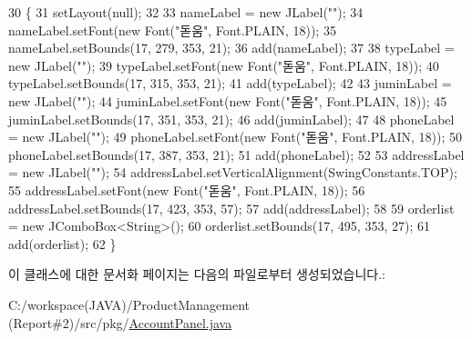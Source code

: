 \begin{DoxyCode}
30                               \{
31         setLayout(null);
32         
33         nameLabel = \textcolor{keyword}{new} JLabel(\textcolor{stringliteral}{""});
34         nameLabel.setFont(\textcolor{keyword}{new} Font(\textcolor{stringliteral}{"돋움"}, Font.PLAIN, 18));
35         nameLabel.setBounds(17, 279, 353, 21);
36         add(nameLabel);
37         
38         typeLabel = \textcolor{keyword}{new} JLabel(\textcolor{stringliteral}{""});
39         typeLabel.setFont(\textcolor{keyword}{new} Font(\textcolor{stringliteral}{"돋움"}, Font.PLAIN, 18));
40         typeLabel.setBounds(17, 315, 353, 21);
41         add(typeLabel);
42         
43         juminLabel = \textcolor{keyword}{new} JLabel(\textcolor{stringliteral}{""});
44         juminLabel.setFont(\textcolor{keyword}{new} Font(\textcolor{stringliteral}{"돋움"}, Font.PLAIN, 18));
45         juminLabel.setBounds(17, 351, 353, 21);
46         add(juminLabel);
47         
48         phoneLabel = \textcolor{keyword}{new} JLabel(\textcolor{stringliteral}{""});
49         phoneLabel.setFont(\textcolor{keyword}{new} Font(\textcolor{stringliteral}{"돋움"}, Font.PLAIN, 18));
50         phoneLabel.setBounds(17, 387, 353, 21);
51         add(phoneLabel);
52         
53         addressLabel = \textcolor{keyword}{new} JLabel(\textcolor{stringliteral}{""});
54         addressLabel.setVerticalAlignment(SwingConstants.TOP);
55         addressLabel.setFont(\textcolor{keyword}{new} Font(\textcolor{stringliteral}{"돋움"}, Font.PLAIN, 18));
56         addressLabel.setBounds(17, 423, 353, 57);
57         add(addressLabel);
58         
59         orderlist = \textcolor{keyword}{new} JComboBox<String>();
60         orderlist.setBounds(17, 495, 353, 27);
61         add(orderlist);
62     \}
\end{DoxyCode}


이 클래스에 대한 문서화 페이지는 다음의 파일로부터 생성되었습니다.\+:\begin{DoxyCompactItemize}
\item 
C\+:/workspace(\+J\+A\+V\+A)/\+Product\+Management (\+Report\#2)/src/pkg/\hyperlink{_account_panel_8java}{Account\+Panel.\+java}\end{DoxyCompactItemize}
